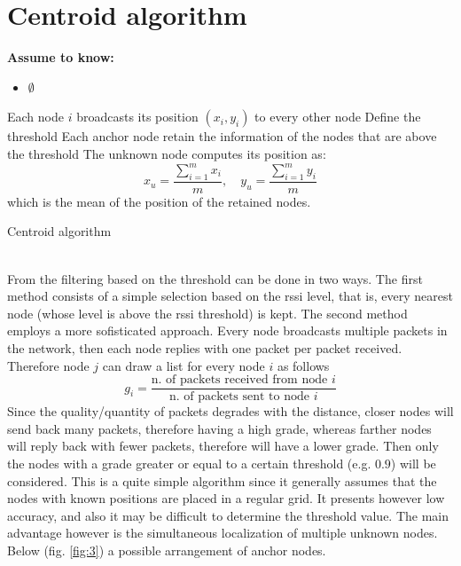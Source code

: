 \documentclass[12pt]{report}
\begin{document}
\section{Centroid algorithm}
  \begin{center}
  \textbf{Assume to know:}
  \begin{itemize}
    \centering
    \item $\emptyset$
  \end{itemize}
  \end{center}
\begin{algorithm}[H]
\SetAlgoLined
{}
 Each node $i$ broadcasts its position $(x_i,y_i)$ to every other node\;
 Define the threshold\;
 Each anchor node retain the information of the nodes that are above the threshold\;
 The unknown node computes its position as:
 \begin{equation}
     x_u=\frac{\sum_{i=1}^mx_i}{m},\quad y_u=\frac{\sum_{i=1}^my_i}{m}
 \end{equation}
which is the mean of the position of the retained nodes.
 \caption{Centroid algorithm}
\end{algorithm}
\noindent\\From \cite{878533} the filtering based on the threshold can be done in two ways. The first method consists of a simple selection based on the rssi level, that is, every nearest node (whose level is above the rssi threshold) is kept. The second method employs a more sofisticated approach. Every node broadcasts multiple packets in the network, then each node replies with one packet per packet received. Therefore node $j$ can draw a list for every node $i$ as follows 
\begin{equation}
    g_i = \frac{\text{n. of packets received from node $i$}}{\text{n. of packets sent to node $i$}}
\end{equation}
Since the quality/quantity of packets degrades with the distance, closer nodes will send back many packets, therefore having a high grade, whereas farther nodes will reply back with fewer packets, therefore will have a lower grade. Then only the nodes with a grade greater or equal to a certain threshold (e.g. $0.9$) will be considered. This is a quite simple algorithm since it generally assumes that the nodes with known positions are placed in a regular grid. It presents however low accuracy, and also it may be difficult to determine the threshold value. The main advantage however is the simultaneous localization of multiple unknown nodes. Below (fig. \ref{fig:3}) a possible arrangement of anchor nodes.
\end{document}
